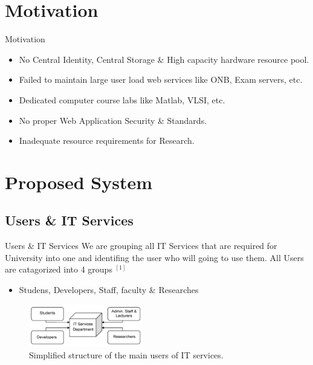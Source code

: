 \documentclass[xcolor=dvipsnames]{beamer}
\begin{document}
\section{Motivation}
\begin{frame}{Motivation}

\begin{itemize}
	\item No Central Identity, Central Storage \& High capacity hardware resource pool.
	\item Failed to maintain large user load web services like ONB, Exam servers, etc.
	\item Dedicated computer course labs like Matlab, VLSI, etc.
	\item No proper Web Application Security \& Standards.
	\item Inadequate resource requirements for Research.
\end{itemize}

\end{frame}



\section{Proposed System}
\subsection{Users \& IT Services}
\begin{frame}{Users \& IT Services}
We are grouping all IT Services that are required for University into one and identifing the user who will going to use them. All Users are catagorized into 4 groups $ ^{[1]}$
	
	\begin{itemize}
	\item Studens, Developers, Staff, faculty \& Researches
	\end{itemize}
\begin{figure}[H]
\begin{center}
\includegraphics[width=5cm]{./it.png}
\caption{ Simplified structure of the main users of IT services. \label{fig:Simplified structure of the main users of IT services. }}
\end{center}
\end{figure}
	
\end{frame}
\end{document}
